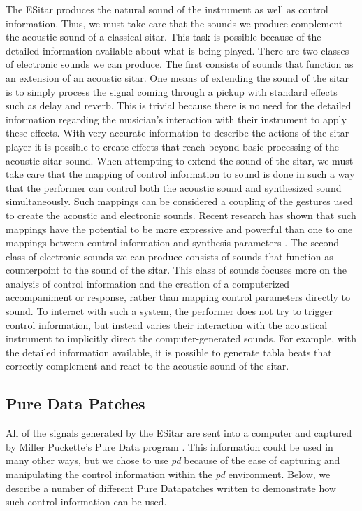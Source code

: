 The ESitar produces the natural sound of the instrument as well as
control information. Thus, we must take care that the sounds we produce
complement the acoustic sound of a classical sitar. This task is possible because
of the detailed information available about what is being played. There are two
classes of electronic sounds we can produce. The first consists of sounds that
function as an extension of an acoustic sitar. One means of extending the sound
of the sitar is to simply process the signal coming through a pickup with
standard effects such as delay and reverb. This is trivial because there is no
need for the detailed information regarding the musician's interaction with their
instrument to apply these effects. With very accurate information to describe the
actions of the sitar player it is possible to create effects that reach beyond
basic processing of the acoustic sitar sound. When attempting to extend the sound
of the sitar, we must take care that the mapping of control information to sound
is done in such a way that the performer can control both the acoustic sound and
synthesized sound simultaneously. Such mappings can be considered a coupling of
the gestures used to create the acoustic and electronic sounds. Recent research
has shown that such mappings have the potential to be more expressive and
powerful than one to one mappings between control information and synthesis
parameters \cite{Hunt:2002}. The second class of electronic sounds we can produce consists of
sounds that function as counterpoint to the sound of the sitar. This class of
sounds focuses more on the analysis of control information and the creation of a
computerized accompaniment or response, rather than mapping control parameters
directly to sound. To interact with such a system, the performer does not try to
trigger control information, but instead varies their interaction with the
acoustical instrument to implicitly direct the computer-generated sounds.  For
example, with the detailed information available, it is possible to generate
tabla beats that correctly complement and react to the acoustic sound of the
sitar.

\subsection{Pure Data Patches}

All of the signals generated by the ESitar are sent into a computer and
captured by Miller Puckette's Pure Data program \cite{Puckette:1996a}. This information
could be used in many other ways, but we chose to use \textit{pd} because of the
ease of capturing and manipulating the control information within the \textit{pd}
environment. Below, we describe a number of different Pure Datapatches
written to demonstrate how such control information can be used.

